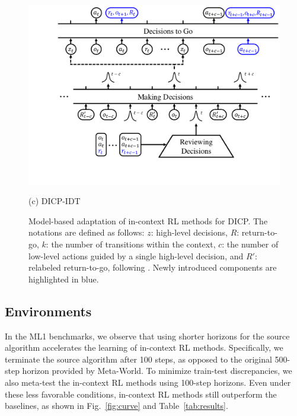 \documentclass{article}
\begin{document}
\begin{figure}[t]
\begin{center}
\begin{minipage}{0.64\textwidth}
        \begin{center}
            \includegraphics[width=\textwidth, trim={84pt 84pt 0pt 0pt}, clip]{figures/architecture-2.pdf}
        \caption*{(c) DICP-IDT}
        \end{center}
    \end{minipage}
    \end{center}
    \caption{Model-based adaptation of in-context RL methods for DICP.
    The notations are defined as follows: $z$: high-level decisions, $R$: return-to-go, $k$: the number of transitions within the context, $c$: the number of low-level actions guided by a single high-level decision, and $R'$: relabeled return-to-go, following \citep{IDT}.
    Newly introduced components are highlighted in blue.
    }
    \label{fig:models}
\end{figure}

\subsection{Environments}

In the ML1 benchmarks, we observe that using shorter horizons for the source algorithm accelerates the learning of in-context RL methods.
Specifically, we terminate the source algorithm after 100 steps, as opposed to the original 500-step horizon provided by Meta-World.
To minimize train-test discrepancies, we also meta-test the in-context RL methods using 100-step horizons.
Even under these less favorable conditions, in-context RL methods still outperform the baselines, as shown in Fig.~\ref{fig:curve} and Table~\ref{tab:results}.
\end{document}
